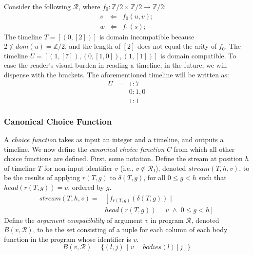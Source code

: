 \begin{example}
Consider the following $\mathcal{R}$, where $f_0 : \mathbb{Z}/2 \times \mathbb{Z}/2 \rightarrow \mathbb{Z}/2$:
\begin{eqnarray*}
  s &\Leftarrow& f_0(u, v); \\
  w &\Leftarrow& f_1(s);
\end{eqnarray*}
The timeline $T = [(0, [2])]$ is domain incompatible because $2 \not\in dom(u) = \mathbb{Z}/2$, and the length of $[2]$ does not equal the arity of $f_0$.  The timeline $U = [(1,[7]), (0,[1,0]), (1,[1])]$ is domain compatible.  To ease the reader's visual burden in reading a timeline, in the future, we will dispense with the brackets.  The aforementioned timeline will be written as:
\begin{eqnarray*}
U & = & 1 : 7 \\
 		&		& 0 : 1, 0 \\
		&		& 1 : 1
\end{eqnarray*}

\end{example}

\subsubsection{Canonical Choice Function}

A {\em choice function} takes as input an integer and a timeline, and outputs a timeline.  We now define the {\em canonical choice function} $C$ from which all other choice functions are defined.  First, some notation.  
Define the stream at position $h$ of timeline $T$ for non-input identifier $v$ (i.e., $v \not\in \mathcal{R}_I$), denoted $stream(T,h,v)$, to be the results of applying $r(T,g)$ to $\delta(T,g)$, for all $0 \leq g < h$ such that $head(r(T,g)) = v$, ordered by $g$.
\begin{equation*}
\begin{split}
stream(T,h,v) = & \left[ f_{r(T,g)}(\delta(T,g)) \,\, | \right. \\
& \left. head(r(T,g)) = v \,\, \land \,\, 0 \leq g < h \right]
\end{split}
\end{equation*}
Define the {\em argument compatibility} of argument $v$ in program $\mathcal{R}$, denoted $B(v,\mathcal{R})$, to be the set consisting of a tuple for each column of each body function in the program whose identifier is $v$.
$$
B(v,\mathcal{R}) = \{(l,j) \,\, | \,\, v = bodies(l)[j]\}
$$

